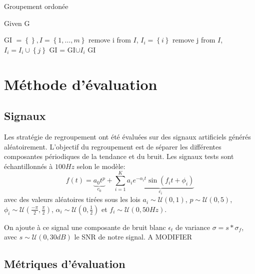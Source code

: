 \documentclass{gretsi}
\newcommand{\set}[1]{\left \{ 1, \dots, #1 \right \}}
\begin{document}
\begin{algorithm}
\caption{Groupement ordonée}\label{alg:ord}
Given G
\begin{algorithmic}[1]
\State GI $= \left \{  \right \}, I = \set{m}$
\State remove i from $I$, $I_i = \left \{ i \right \}$
\State remove j from $I$, $I_i = I_i \cup \left \{ j \right \}$
\EndIf
\EndFor
\State GI = GI$ \cup I_i$
\EndFor
\State \Return GI
\end{algorithmic}
\end{algorithm}


\section{Méthode d'évaluation}
\label{sec:eval}

\subsection{Signaux}
\label{sub:artsig}

    Les stratégie de regroupement ont été évaluées sur des signaux artificiels générés aléatoirement. L'objectif du regroupement est de séparer les différentes composantes périodiques de la tendance et du bruit. Les signaux tests sont échantillonnés à $100 Hz$ selon le modèle:
    \begin{equation}\label{eq:artsig}
    f(t) = \underbrace{a_0 t^p}_{c_0} + \sum_{i=1}^K \underbrace{a_i e^{-\alpha_i t} \sin\left(f_i t + \phi_i\right)}_{c_i}
    \end{equation} avec des valeurs aléatoires tirées sous les lois $a_i \sim \mathcal U(0, 1)$, $p \sim \mathcal U(0, 5)$, $\displaystyle \phi_i \sim \mathcal U\left(\frac{-\pi}{2}, \frac{\pi}{2}\right)$, $\alpha_i \sim \mathcal U\left(0, \frac{1}{2}\right)$ et $f_i \sim \mathcal U(0, 50Hz)$.
    
    On ajoute à ce signal une composante de bruit blanc $\epsilon_t$ de variance $\sigma = s*\sigma_f$, avec $s \sim \mathcal U(0, 30dB)$ le SNR de notre signal.
A MODIFIER


\subsection{Métriques d'évaluation}
\label{sub:met}
\end{document}
